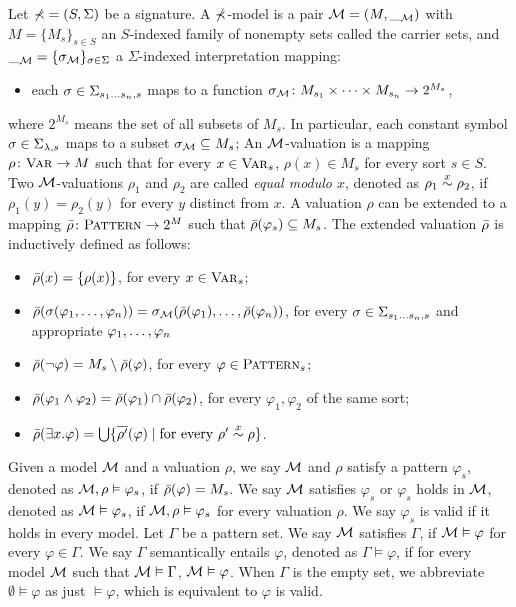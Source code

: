 \documentclass{amsart}
\begin{document}
\begin{definition}
\label{def_models}
Let $\mathbb{\Sigma} = (S, \Sigma)$ be a signature.
A $\mathbb{\Sigma}$-model is a pair
$\mathcal{M} = (M, \__{\mathcal{M}})$ with
$M = \{M_s\}_{s \in S}$ an $S$-indexed family of nonempty sets called
the carrier sets,
and $\__{\mathcal{M}} = \{ {\sigma_{\mathcal{M}}} \}_{\sigma \in \Sigma}$
a $\Sigma$-indexed interpretation mapping:
\begin{itemize}
\item each $\sigma \in \Sigma_{s_1 \dots s_n , s}$
      maps to a function
      ${\sigma_{\mathcal{M}}} \colon M_{s_1} \times \dots \times M_{s_n} \to 2^{M_s}$,
\end{itemize}
where $2^{M_s}$ means the set of all subsets of $M_s$.
In particular, each constant symbol
$\sigma \in \Sigma_{\lambda,s}$ 
maps to a subset ${\sigma_{\mathcal{M}}} \subseteq M_s$;
An $\mathcal{M}$-valuation is a mapping
$\rho \colon \textnormal{\textsc{Var}} \to M$
such that for every $x \in \textnormal{\textsc{Var}}_s$, $\rho(x) \in M_s$ for every sort $s \in S$.
Two $\mathcal{M}$-valuations $\rho_1$ and $\rho_2$ are called 
\emph{equal modulo $x$},
denoted as $\rho_1 \overset{x}{\sim} \rho_2$,
if $\rho_1(y) = \rho_2(y)$ for every $y$ distinct from $x$.
A valuation $\rho$ can be extended to a mapping
$\bar{\rho} \colon \textnormal{\textsc{Pattern}} \to 2^{M}$
such that $\bar{\rho}(\varphi_s) \subseteq M_s$.
The extended valuation $\bar{\rho}$ is inductively defined as follows:
\begin{itemize}
\item $\bar{\rho}(x) = \{ \rho(x) \}$, for every $x \in \textnormal{\textsc{Var}}_s$;
\item $\bar{\rho}(\sigma(\varphi_1 ,\dots, \varphi_n))
       = {\sigma_{\mathcal{M}}}( \bar{\rho}(\varphi_1) ,\dots, \bar{\rho}(\varphi_n) )$,
      for every $\sigma \in \Sigma_{s_1 \dots s_n , s}$
      and appropriate $\varphi_1 ,\dots, \varphi_n$
\item $\bar{\rho}(\neg \varphi) = M_s \setminus \bar{\rho}(\varphi)$,
      for every $\varphi \in \textnormal{\textsc{Pattern}}_s$;
\item $\bar{\rho}(\varphi_1 \wedge \varphi_2)
       = \bar{\rho}(\varphi_1) \cap \bar{\rho}(\varphi_2)$,
      for every $\varphi_1,\varphi_2$ of the same sort;
\item $\bar{\rho}(\exists x . \varphi)
       = \bigcup \{ \overline{\rho'}(\varphi) 
                    \mid \text{for every $\rho' \overset{x}{\sim} \rho$} \}$.
\end{itemize}
Given a model $\mathcal{M}$ and a valuation $\rho$,
we say $\mathcal{M}$ and $\rho$ satisfy a pattern $\varphi_s$,
denoted as $\mathcal{M},\rho \vDash \varphi_s$,
if $\bar{\rho}(\varphi) = M_s$.
We say $\mathcal{M}$ satisfies $\varphi_s$
or $\varphi_s$ holds in $\mathcal{M}$,
denoted as $\mathcal{M} \vDash \varphi_s$,
if $\mathcal{M} , \rho \vDash \varphi_s$ for every valuation $\rho$.
We say $\varphi_s$ is valid if
it holds in every model.
Let $\Gamma$ be a pattern set.
We say $\mathcal{M}$ satisfies $\Gamma$, if
$\mathcal{M} \vDash \varphi$ for every $\varphi \in \Gamma$.
We say $\Gamma$ semantically entails $\varphi$,
denoted as $\Gamma \vDash \varphi$,
if for every model $\mathcal{M}$ such that $\mathcal{M} \vDash \Gamma$,
$\mathcal{M} \vDash \varphi$.
When $\Gamma$ is the empty set, we abbreviate
$\emptyset \vDash \varphi$ as just $\vDash \varphi$,
which is equivalent to $\varphi$ is valid.
\end{definition}
\end{document}
